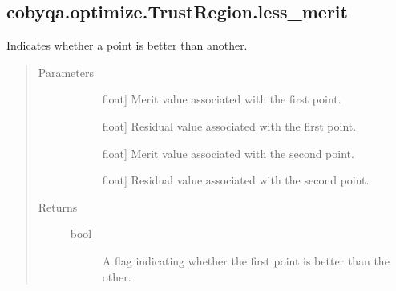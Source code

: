 \documentclass[letterpaper,10pt,english]{sphinxmanual}
\begin{document}
\begin{fulllineitems}
\begin{fulllineitems}
\begin{quote}
\begin{description}
\begin{description}
\end{description}

\end{description}\end{quote}

\end{fulllineitems}



\subsection{cobyqa.optimize.TrustRegion.less\_merit}
\label{\detokenize{refs/generated/cobyqa.optimize.TrustRegion.less_merit:cobyqa-optimize-trustregion-less-merit}}\label{\detokenize{refs/generated/cobyqa.optimize.TrustRegion.less_merit::doc}}

\begin{fulllineitems}
\label{\detokenize{refs/generated/cobyqa.optimize.TrustRegion.less_merit:cobyqa.optimize.TrustRegion.less_merit}}
\sphinxAtStartPar
Indicates whether a point is better than another.
\begin{quote}\begin{description}
\item[{Parameters}] \leavevmode\begin{description}
\item[{}] \leavevmode{[}float{]}
\sphinxAtStartPar
Merit value associated with the first point.

\item[{}] \leavevmode{[}float{]}
\sphinxAtStartPar
Residual value associated with the first point.

\item[{}] \leavevmode{[}float{]}
\sphinxAtStartPar
Merit value associated with the second point.

\item[{}] \leavevmode{[}float{]}
\sphinxAtStartPar
Residual value associated with the second point.

\end{description}

\item[{Returns}] \leavevmode\begin{description}
\item[{bool}] \leavevmode
\sphinxAtStartPar
A flag indicating whether the first point is better than the other.


\end{description}
\end{description}
\end{quote}
\end{fulllineitems}
\end{fulllineitems}
\end{document}
